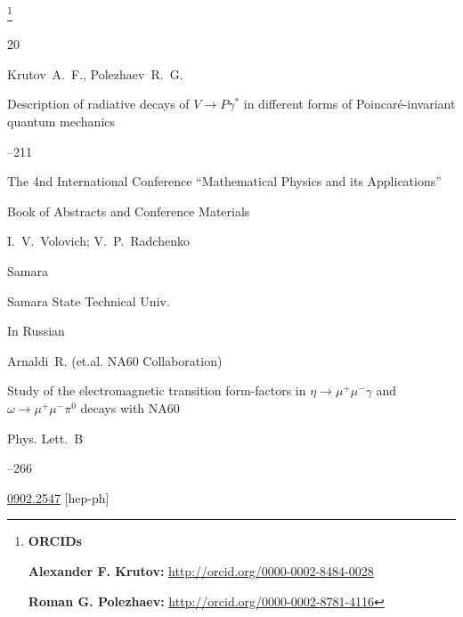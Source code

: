 \thanks{{\bf ORCIDs}



{\bf Alexander F. Krutov:} \url{http://orcid.org/0000-0002-8484-0028}



{\bf Roman G. Polezhaev:} \url{http://orcid.org/0000-0002-8781-4116}



}







\EngRef





\begin{thebibliography}{20}




\by  Krutov~A.~F., Polezhaev~R.~G.

\paper Description of radiative decays of $V \to P \gamma^{*}$ in different forms of Poincar\'e-invariant quantum mechanics

--211

\inbook  The 4nd International Conference ``Mathematical Physics and its Applications''

\bookinfo Book of Abstracts and Conference Materials

\eds I.~V.~Volovich; V.~P.~Radchenko

\publaddr Samara

\publ Samara State Technical Univ.


\lang In Russian






\by Arnaldi~R. (et.al. NA60 Collaboration)

\paper Study of the electromagnetic transition form-factors in $\eta\to \mu^{+}\mu^{-}\gamma$ and $\omega\to \mu^{+}\mu^{-}\pi^{0}$ decays with NA60

\jour Phys. Lett.~B



--266



\arxiv \href{http://arxiv.org/abs/0902.2547}{0902.2547} [hep-ph]




\end{thebibliography}
